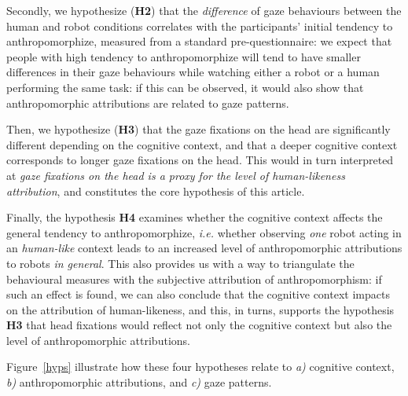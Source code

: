 \documentclass[lettersize, noapacite, twoside, HRI]{apa_HRI}
\newcommand{\ie}{\textit{i.e.}\xspace}
\newcommand{\h}[1]{\textbf{H#1}\xspace}
\begin{document}
Secondly, we hypothesize (\h{2}) that the \emph{difference} of gaze
behaviours between the human and robot conditions correlates with the
participants' initial tendency to anthropomorphize, measured from a standard
pre-questionnaire: we expect that people with high tendency to anthropomorphize
will tend to have smaller differences in their gaze behaviours while watching
either a robot or a human performing the same task: if this can be observed, it
would also show that anthropomorphic attributions are related to gaze patterns.

Then, we hypothesize (\h{3}) that the gaze fixations on the head are
significantly different depending on the cognitive context, and that a deeper
cognitive context corresponds to longer gaze fixations on the head. This would
in turn interpreted at \emph{gaze fixations on the head is a proxy for the level
of human-likeness attribution}, and constitutes the core hypothesis of this
article.

Finally, the hypothesis \h{4} examines whether the cognitive context affects the
general tendency to anthropomorphize, \ie whether observing \emph{one}
robot acting in an \emph{human-like} context leads to an increased level of
anthropomorphic attributions to robots \emph{in general}. This also provides us
with a way to triangulate the behavioural measures with the subjective
attribution of anthropomorphism: if such an effect is found, we can also
conclude that the cognitive context impacts on the attribution of human-likeness,
and this, in turns, supports the hypothesis \h{3} that head fixations would
reflect not only the cognitive context but also the level of anthropomorphic
attributions.

Figure~\ref{hyps} illustrate how these four hypotheses relate to \emph{a)}
cognitive context, \emph{b)} anthropomorphic attributions, and \emph{c)} gaze
patterns.
\end{document}
